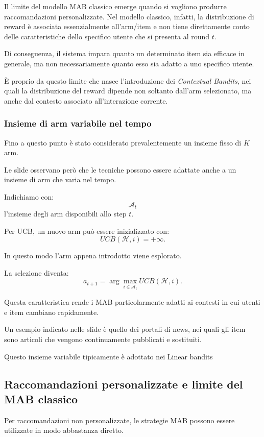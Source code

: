 Il limite del modello MAB classico emerge quando si vogliono produrre raccomandazioni personalizzate. Nel modello classico, infatti, la distribuzione di reward è associata essenzialmente all'arm/item e non tiene direttamente conto delle caratteristiche dello specifico utente che si presenta al round $t$.

Di conseguenza, il sistema impara quanto un determinato item sia efficace in generale, ma non necessariamente quanto esso sia adatto a uno specifico utente.

È proprio da questo limite che nasce l'introduzione dei \emph{Contextual Bandits}, nei quali la distribuzione del reward dipende non soltanto dall'arm selezionato, ma anche dal contesto associato all'interazione corrente.

\subsubsection{Insieme di arm variabile nel tempo}

Fino a questo punto è stato considerato prevalentemente un insieme fisso di $K$ arm.

Le slide osservano però che le tecniche possono essere adattate anche a un insieme di arm che varia nel tempo.

Indichiamo con:
\[
\mathcal{A}_t
\]
l'insieme degli arm disponibili allo step $t$.

Per UCB, un nuovo arm può essere inizializzato con:
\[
UCB(\mathcal{H},i)=+\infty.
\]

In questo modo l'arm appena introdotto viene esplorato.

La selezione diventa:
\[
a_{t+1}
=
\arg\max_{i\in\mathcal{A}_t}
UCB(\mathcal{H},i).
\]

Questa caratteristica rende i MAB particolarmente adatti ai contesti in cui utenti e item cambiano rapidamente.

Un esempio indicato nelle slide è quello dei portali di news, nei quali gli item sono articoli che vengono continuamente pubblicati e sostituiti.

Questo insieme variabile tipicamente è adottato nei Linear bandits

\subsection{Raccomandazioni personalizzate e limite del MAB classico}

Per raccomandazioni non personalizzate, le strategie MAB possono essere utilizzate in modo abbastanza diretto.

